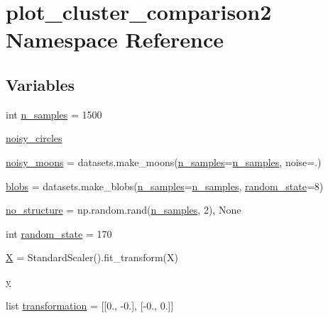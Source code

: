 \hypertarget{namespaceplot__cluster__comparison2}{}\section{plot\+\_\+cluster\+\_\+comparison2 Namespace Reference}
\label{namespaceplot__cluster__comparison2}
\subsection*{Variables}
\begin{DoxyCompactItemize}
\item 
int \hyperlink{namespaceplot__cluster__comparison2_ab79e3292af180973ba0da8e7c55b6d76}{n\+\_\+samples} = 1500
\item 
\hyperlink{namespaceplot__cluster__comparison2_a8103b5c4753a845010596f9b5264ea66}{noisy\+\_\+circles}
\item 
\hyperlink{namespaceplot__cluster__comparison2_a1780ed2b6f82e2a53c30cda12462a26b}{noisy\+\_\+moons} = datasets.\+make\+\_\+moons(\hyperlink{namespaceplot__cluster__comparison2_ab79e3292af180973ba0da8e7c55b6d76}{n\+\_\+samples}=\hyperlink{namespaceplot__cluster__comparison2_ab79e3292af180973ba0da8e7c55b6d76}{n\+\_\+samples}, noise=.)
\item 
\hyperlink{namespaceplot__cluster__comparison2_a48f2da74d3a038459d84fae4373c9c21}{blobs} = datasets.\+make\+\_\+blobs(\hyperlink{namespaceplot__cluster__comparison2_ab79e3292af180973ba0da8e7c55b6d76}{n\+\_\+samples}=\hyperlink{namespaceplot__cluster__comparison2_ab79e3292af180973ba0da8e7c55b6d76}{n\+\_\+samples}, \hyperlink{namespaceplot__cluster__comparison2_a58de884130398415c315dc68b9c744ca}{random\+\_\+state}=8)
\item 
\hyperlink{namespaceplot__cluster__comparison2_a665ebb9e10a5cd7b4f62c550a8868f40}{no\+\_\+structure} = np.\+random.\+rand(\hyperlink{namespaceplot__cluster__comparison2_ab79e3292af180973ba0da8e7c55b6d76}{n\+\_\+samples}, 2), None
\item 
int \hyperlink{namespaceplot__cluster__comparison2_a58de884130398415c315dc68b9c744ca}{random\+\_\+state} = 170
\item 
\hyperlink{namespaceplot__cluster__comparison2_a8e252c334e74232a95e8cd3f77445dc4}{X} = Standard\+Scaler().fit\+\_\+transform(X)
\item 
\hyperlink{namespaceplot__cluster__comparison2_afec14e7f171aedf7f79b22b85f0c60a1}{y}
\item 
list \hyperlink{namespaceplot__cluster__comparison2_a2585f93108b8873ecdfdc02d2830c7c2}{transformation} = \mbox{[}\mbox{[}0., -\/0.\mbox{]}, \mbox{[}-\/0., 0.\mbox{]}\mbox{]}

\end{DoxyCompactItemize}
